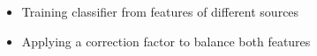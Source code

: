 \begin{itemize}
	\item Training classifier from features of different sources
	\item Applying a correction factor to balance both features
\end{itemize}